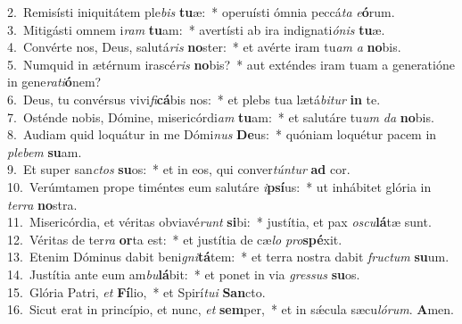 {2.~}Remisísti iniquitátem ple\textit{bis} \textbf{tu}æ:~* operuísti ómnia peccá\textit{ta} \textit{e}\textbf{ó}rum.\\
{3.~}Mitigásti omnem i\textit{ram} \textbf{tu}am:~* avertísti ab ira indignati\textit{ó}\textit{nis} \textbf{tu}æ.\\
{4.~}Convérte nos, Deus, salutá\textit{ris} \textbf{no}ster:~* et avérte iram tu\textit{am} \textit{a} \textbf{no}bis.\\
{5.~}Numquid in ætérnum irascé\textit{ris} \textbf{no}bis?~* aut exténdes iram tuam a generatióne in gene\textit{ra}\textit{ti}\textbf{ó}nem?\\
{6.~}Deus, tu convérsus vivi\textit{fi}\textbf{cá}bis nos:~* et plebs tua lætá\textit{bi}\textit{tur} \textbf{in} te.\\
{7.~}Osténde nobis, Dómine, misericórdi\textit{am} \textbf{tu}am:~* et salutáre tu\textit{um} \textit{da} \textbf{no}bis.\\
{8.~}Audiam quid loquátur in me Dómi\textit{nus} \textbf{De}us:~* quóniam loquétur pacem in \textit{ple}\textit{bem} \textbf{su}am.\\
{9.~}Et super san\textit{ctos} \textbf{su}os:~* et in eos, qui conver\textit{tún}\textit{tur} \textbf{ad} cor.\\
{10.~}Verúmtamen prope timéntes eum salutáre \textit{i}\textbf{psí}us:~* ut inhábitet glória in \textit{ter}\textit{ra} \textbf{no}stra.\\
{11.~}Misericórdia, et véritas obviavé\textit{runt} \textbf{si}bi:~* justítia, et pax \textit{o}\textit{scu}\textbf{lá}tæ sunt.\\
{12.~}Véritas de ter\textit{ra} \textbf{or}ta est:~* et justítia de cæ\textit{lo} \textit{pro}\textbf{spé}xit.\\
{13.~}Etenim Dóminus dabit beni\textit{gni}\textbf{tá}tem:~* et terra nostra dabit \textit{fru}\textit{ctum} \textbf{su}um.\\
{14.~}Justítia ante eum am\textit{bu}\textbf{lá}bit:~* et ponet in via \textit{gres}\textit{sus} \textbf{su}os.\\
{15.~}Glória Patri, \textit{et} \textbf{Fí}lio,~* et Spirí\textit{tu}\textit{i} \textbf{San}cto.\\
{16.~}Sicut erat in princípio, et nunc, \textit{et} \textbf{sem}per,~* et in sǽcula sæcu\textit{ló}\textit{rum}. \textbf{A}men.\\
